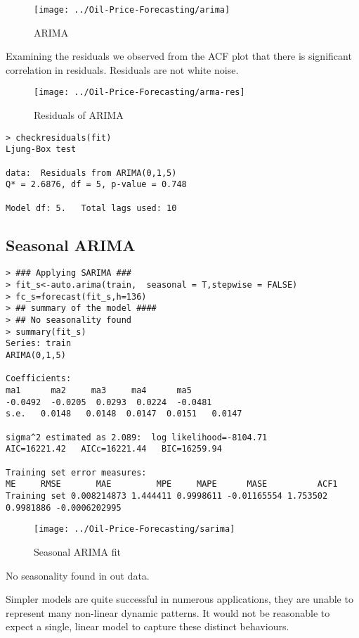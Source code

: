 \documentclass[11pt,a4paper]{article}
\begin{document}
\begin{figure}[h!]
	\centering
	\texttt{[image: ../Oil-Price-Forecasting/arima]}
	\caption{ARIMA}
	\label{fig:arima}
\end{figure}
Examining the residuals we observed from the ACF plot that there is significant correlation in residuals. Residuals are not white noise.

\begin{figure}[h!]
	\centering
	\texttt{[image: ../Oil-Price-Forecasting/arma-res]}
	\caption{Residuals of ARIMA}
	\label{fig:arma-res}
\end{figure}

\begin{lstlisting}
> checkresiduals(fit)
Ljung-Box test

data:  Residuals from ARIMA(0,1,5)
Q* = 2.6876, df = 5, p-value = 0.748

Model df: 5.   Total lags used: 10
\end{lstlisting}
\pagebreak
\subsection{Seasonal ARIMA}


\begin{lstlisting}
> ### Applying SARIMA ###
> fit_s<-auto.arima(train,  seasonal = T,stepwise = FALSE)
> fc_s=forecast(fit_s,h=136)
> ## summary of the model ####
> ## No seasonality found
> summary(fit_s)
Series: train 
ARIMA(0,1,5) 

Coefficients:
ma1      ma2     ma3     ma4      ma5
-0.0492  -0.0205  0.0293  0.0224  -0.0481
s.e.   0.0148   0.0148  0.0147  0.0151   0.0147

sigma^2 estimated as 2.089:  log likelihood=-8104.71
AIC=16221.42   AICc=16221.44   BIC=16259.94

Training set error measures:
ME     RMSE       MAE         MPE     MAPE      MASE          ACF1
Training set 0.008214873 1.444411 0.9998611 -0.01165554 1.753502 0.9981886 -0.0006202995

\end{lstlisting}

\begin{figure}[h!]
	\centering
	\texttt{[image: ../Oil-Price-Forecasting/sarima]}
	\caption{Seasonal ARIMA fit}
	\label{fig:sarima}
\end{figure}
No seasonality found in out data. 


Simpler models are quite successful in numerous applications, they are unable to represent many non-linear dynamic patterns. It would not be reasonable to expect a single, linear model to capture these distinct behaviours.\cite{chen2017forecasting}
\end{document}
